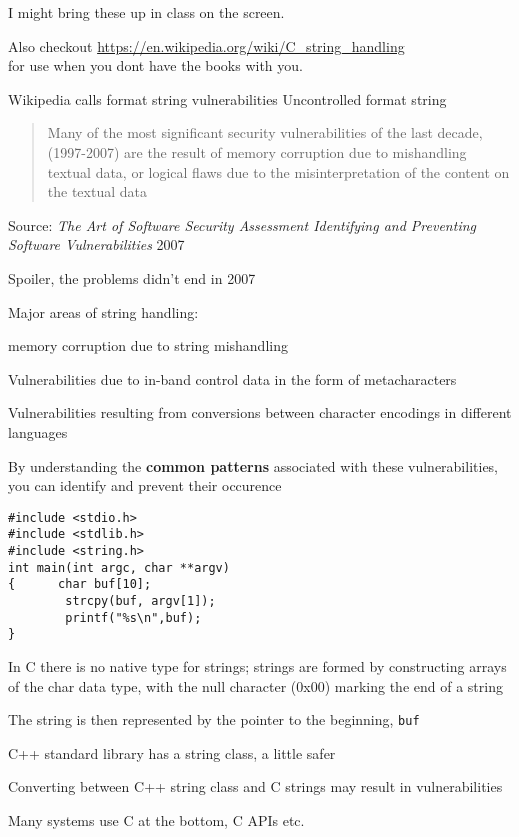 \documentclass[Screen16to9,17pt]{foils}
\begin{document}
I might bring these up in class on the screen.

Also checkout \url{https://en.wikipedia.org/wiki/C_string_handling}\\
for use when you dont have the books with you.

Wikipedia calls format string vulnerabilities Uncontrolled format string\\




\begin{quote}
Many of the most significant security vulnerabilities of the last decade, (1997-2007) are the result of memory corruption due to mishandling textual data, or logical flaws due to the misinterpretation of the content on the textual data
\end{quote}
Source: \emph{The Art of Software Security Assessment Identifying and Preventing
Software Vulnerabilities} 2007

\begin{list1}
\item Spoiler, the problems didn't end in 2007
\item Major areas of string handling:
\begin{list2}
\item memory corruption due to string mishandling
\item Vulnerabilities due to in-band control data in the form of metacharacters
\item Vulnerabilities resulting from conversions between character encodings in different languages
\end{list2}
\item By understanding the {\bf common patterns} associated with these vulnerabilities, you can identify and prevent their occurence
\end{list1}



\begin{verbatim}
#include <stdio.h>
#include <stdlib.h>
#include <string.h>
int main(int argc, char **argv)
{      char buf[10];
        strcpy(buf, argv[1]);
        printf("%s\n",buf);
}
\end{verbatim}


\begin{list2}
\item In C there is no native type for strings; strings are formed by constructing arrays of the char data type, with the null character (0x00) marking the end of a string
\item The string is then represented by the pointer to the beginning, \verb+buf+
\item C++ standard library has a string class, a little safer
\item Converting between C++ string class and C strings may result in vulnerabilities
\item Many systems use C at the bottom, C APIs etc.
\end{list2}
\end{document}
